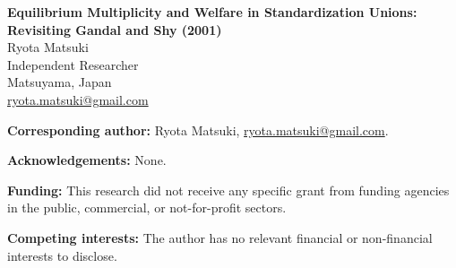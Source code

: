 \documentclass[11pt]{article}
\begin{document}
\begin{center}
{\Large\bfseries Equilibrium Multiplicity and Welfare in Standardization Unions:\\[4pt]
Revisiting Gandal and Shy (2001)}\\[2em]

{\large Ryota Matsuki}\\[0.5em]
Independent Researcher\\
Matsuyama, Japan\\[0.5em]
\href{mailto:ryota.matsuki@gmail.com}{ryota.matsuki@gmail.com}
\end{center}

\vspace{2em}
\noindent\textbf{Corresponding author:} Ryota Matsuki, \href{mailto:ryota.matsuki@gmail.com}{ryota.matsuki@gmail.com}.

\vspace{1em}
\noindent\textbf{Acknowledgements:} None.

\vspace{1em}
\noindent\textbf{Funding:} This research did not receive any specific grant from funding agencies in the public, commercial, or not-for-profit sectors.

\vspace{1em}
\noindent\textbf{Competing interests:} The author has no relevant financial or non-financial interests to disclose.
\end{document}
